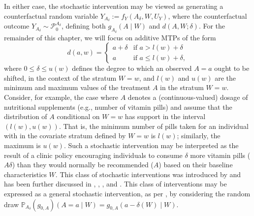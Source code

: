 \documentclass[
  12pt, krantz2,
]{krantz}
\theoremstyle{definition}
\theoremstyle{definition}
\theoremstyle{definition}
\renewcommand{\P}{\mathbb{P}}
\newcommand{\1}{\mathbbm{1}}
\begin{document}
In either case, the stochastic intervention may be viewed as generating a
counterfactual random variable \(Y_{A_{\delta}} := f_Y(A_{\delta}, W, U_Y)\),
where the counterfactual outcome \(Y_{A_{\delta}} \sim \mathcal{P}_0^{A_{\delta}}\), defining both \(g_{A_{\delta}}(A \mid W)\) and \(d(A, W; \delta)\). For the remainder of this chapter, we will focus on additive MTPs
of the form
\begin{equation}
  d(a, w) =
  \begin{cases}
    a + \delta & \text{if } a > l(w) + \delta \\
    a & \text{if } a \leq l(w) + \delta,
  \end{cases}
  \label{eq:shift}
\end{equation}
where \(0 \leq \delta \leq u(w)\) defines the degree to which an observed \(A = a\)
ought to be shifted, in the context of the stratum \(W = w\), and \(l(w)\) and
\(u(w)\) are the minimum and maximum values of the treatment \(A\) in the stratum
\(W = w\). Consider, for example, the case where \(A\) denotes a (continuous-valued)
dosage of nutritional supplements (e.g., number of vitamin pills) and assume
that the distribution of \(A\) conditional on \(W = w\) has support in the interval
\((l(w), u(w))\). That is, the minimum number of pills taken for an individual
with in the covariate stratum defined by \(W = w\) is \(l(w)\); similarly, the
maximum is \(u(w)\). Such a stochastic intervention may be interpreted as the
result of a clinic policy encouraging individuals to consume \(\delta\) more
vitamin pills (\(A \delta\)) than they would normally be recommended (\(A\)) based
on their baseline characteristics \(W\). This class of stochastic interventions
was introduced by \citet{diaz2012population} and has been further discussed in
\citet{haneuse2013estimation}, \citet{diaz2018stochastic}, \citet{hejazi2020efficient}, and
\citet{hejazi2021semiparametric}. This class of interventions may be expressed as a
general stochastic intervention, as per \citet{diaz2012population}, by considering the
random draw \(\P_{A_{\delta}}(g_{0, A})(A = a \mid W) = g_{0,A}(a - \delta(W) \mid W)\).
\end{document}
